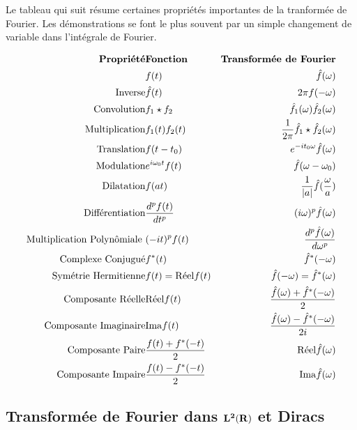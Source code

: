 \newpage

Le tableau qui suit r\'esume certaines propri\'et\'es importantes
de la tranform\'ee de Fourier. Les d\'emonstrations se font
le plus souvent par un simple changement de variable dans
l'int\'egrale de Fourier.

\begin{eqnarray}
\mbox{\bf Propri\'et\'e} & \mbox{\bf Fonction} & 
\mbox{\bf Transform\'ee de Fourier} \nonumber \\ 
&  f(t) & \hat f({\omega}) \nonumber \\
\label{symm}
\mbox{Inverse} & \hat f(t) & 2 \pi f(-{\omega}) \\
\label{convol}
\mbox{Convolution} & f_1 \star f_2 & \hat f_1 ({\omega}) \hat f_2 ({\omega}) \\
\label{mult}
\mbox{Multiplication} & f_1(t) f_2(t) & \frac 1 {2\pi}\hat f_1 \star \hat f_2 ({\omega}) \\
\label{trans}
\mbox{Translation} & f(t-t_0) & e ^{-i t_0 {\omega}} \hat f({\omega}) \\
\label{modul}
\mbox{Modulation} & e ^{i {\omega}_0 t} f(t) & \hat f({\omega} - {\omega}_0) \\
\label{dilate}
\mbox{Dilatation} & f(a t) & \frac 1 {|a|} \hat f (\frac {{\omega}} a ) \\
\label{diffentiation}
\mbox{Diff\'erentiation} & \frac {d^p f(t)} {dt^p} & (i {\omega})^p \hat f({\omega}) \\
\label{polynome}
\mbox{Multiplication Polyn\^omiale } & (- i t)^p f(t)  & \frac {d^p \hat
f({\omega})} {d {\omega}^p} \\
\label{conjugue}
{\rm Complexe~ Conjugu\acute e} & f^*(t) & \hat f^* (-{\omega}) \\
\label{symmHerm}
{\rm Sym\acute etrie~ Hermitienne} & f(t) = {\rm R\acute{e}el} f(t) & 
\hat f (-{\omega}) = \hat f ^* ({\omega}) \\
\label{reelle}
{\rm Composante ~R \acute{e}elle} & {\rm R\acute{e}el} f(t) & \frac {\hat f({\omega}) + 
\hat f^*(-{\omega})} 2 \\
\label{imaginaire}
\mbox{Composante Imaginaire} & {\rm Ima} f(t) & \frac {\hat f({\omega}) - \hat f^* (-{\omega})} {2i} \\
\label{paire}
\mbox{Composante Paire} & \frac {f(t)+f^*(-t)} 2 & {\rm R\acute{e}el} \hat f({\omega}) \\
\label{impaire}
\mbox{Composante Impaire} & \frac {f(t)-f^*(-t)} 2 & {\rm Ima} \hat f({\omega}) 
\end{eqnarray}


\subsection{Transform\'ee de Fourier dans ${\bf L ^ 2 ({\bf{R}})}$ et Diracs}

